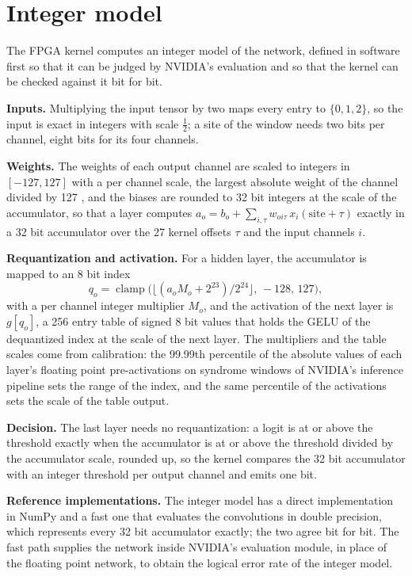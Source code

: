 \section{Integer model}\label{sec:quant}

The FPGA kernel computes an integer model of the network, defined in software first so that it can be judged by
NVIDIA's evaluation and so that the kernel can be checked against it bit for bit.

\textbf{Inputs.} Multiplying the input tensor by two maps every entry to $\{0,1,2\}$, so the input is exact in
integers with scale $\tfrac12$; a site of the window needs two bits per channel, eight bits for its four channels.

\textbf{Weights.} The weights of each output channel are scaled to integers in $[-127,127]$ with a per channel scale, the
largest absolute weight of the channel divided by 127
\cite{jacob2018quantization}, and the biases are rounded to 32 bit integers at the scale of the accumulator, so that a
layer computes $a_o = b_o + \sum_{i,\tau} w_{o i \tau}\, x_{i}(\text{site}+\tau)$ exactly in a 32 bit accumulator over
the 27 kernel offsets $\tau$ and the input channels $i$.

\textbf{Requantization and activation.} For a hidden layer, the accumulator is mapped to an 8 bit index
\begin{equation}
q_o = \operatorname{clamp}\bigl(\lfloor (a_o M_o + 2^{23}) / 2^{24} \rfloor,\, -128,\, 127\bigr),
\end{equation}
with a per channel integer multiplier $M_o$, and the activation of the next layer is $g[q_o]$, a 256 entry table of
signed 8 bit values that holds the GELU of the dequantized index at the scale of the next layer. The multipliers and
the table scales come from calibration: the 99.99th percentile of the absolute values of each layer's floating point pre-activations on
syndrome windows of NVIDIA's inference pipeline sets the range of the index, and the same percentile of the
activations sets the scale of the table output.

\textbf{Decision.} The last layer needs no requantization: a logit is at or above the threshold exactly when the
accumulator is at or above the threshold divided by the accumulator scale, rounded up, so the kernel compares the
32 bit accumulator with an integer threshold per output channel and emits one bit.

\textbf{Reference implementations.} The integer model has a direct implementation in NumPy and a fast one that
evaluates the convolutions in double precision, which represents every 32 bit accumulator exactly; the two agree bit
for bit. The fast path supplies the network inside NVIDIA's evaluation module, in place of the floating point network,
to obtain the logical error rate of the integer model.
